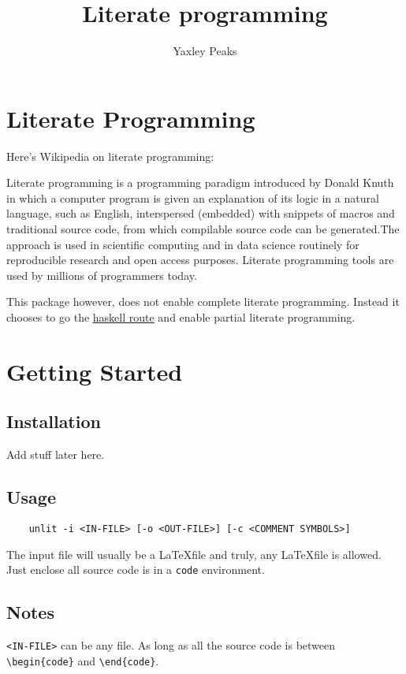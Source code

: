 \documentclass{article}
\title{Literate programming}
\author{Yaxley Peaks}
\newenvironment{code}{\footnotesize\verbatim}{\endverbatim\normalsize}
\begin{document}
\maketitle
\section*{Literate Programming}
Here's Wikipedia on literate programming:
\begin{displayquote}
    Literate programming is a programming paradigm introduced by Donald Knuth in which a computer program is given an explanation of its logic in a natural language, such as English, interspersed (embedded) with snippets of macros and traditional source code, from which compilable source code can be generated.The approach is used in scientific computing and in data science routinely for reproducible research and open access purposes. Literate programming tools are used by millions of programmers today.
\end{displayquote}

This package however, does not enable complete literate programming. Instead it chooses to go the \href{https://wiki.haskell.org/Literate_programming}{haskell route} and enable partial literate programming.

\section{Getting Started}
\subsection{Installation}
Add stuff later here.
\subsection{Usage}
\begin{verbatim}
    unlit -i <IN-FILE> [-o <OUT-FILE>] [-c <COMMENT SYMBOLS>]
    \end{verbatim}

The input file will usually be a \LaTeX  file and truly, any \LaTeX  file is allowed. Just enclose all source code is in a \verb|code| environment.

\subsection{Notes}
\verb|<IN-FILE>| can be any file. As long as all the source code is between \\
\verb|\begin{code}| and \verb|\end{code}|.
\end{document}
